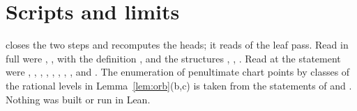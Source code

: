 \documentclass[11pt]{article}
\theoremstyle{remark}
\begin{document}
\section{Scripts and limits}
 closes the two steps and recomputes the heads; it reads  of the leaf pass. Read in full were , ,  with the definition , and the structures , , . Read at the statement were , , , , , , , ,  and . The enumeration of penultimate chart points by classes of the rational levels in Lemma~\ref{lem:orb}(b,c) is taken from the statements of  and . Nothing was built or run in Lean.
\end{document}
